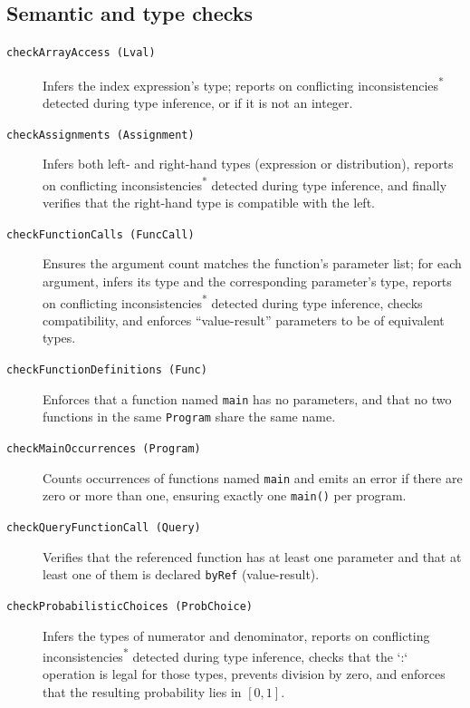 \subsection{Semantic and type checks}

\begin{description}

  \item[\texttt{checkArrayAccess (Lval)}]
    Infers the index expression's type; reports on conflicting inconsistencies\textsuperscript{*} detected during type inference, or if it is not an integer.

  \item[\texttt{checkAssignments (Assignment)}]
    Infers both left- and right-hand types (expression or distribution), reports on conflicting inconsistencies\textsuperscript{*} detected during type inference, and finally verifies that the right-hand type is compatible with the left.

  \item[\texttt{checkFunctionCalls (FuncCall)}]
    Ensures the argument count matches the function's parameter list; for each argument, infers its type and the corresponding parameter's type, reports on conflicting inconsistencies\textsuperscript{*} detected during type inference, checks compatibility, and enforces “value-result” parameters to be of equivalent types.

  \item[\texttt{checkFunctionDefinitions (Func)}]
    Enforces that a function named \texttt{main} has no parameters, and that no two functions in the same \texttt{Program} share the same name.

  \item[\texttt{checkMainOccurrences (Program)}]
    Counts occurrences of functions named \texttt{main} and emits an error if there are zero or more than one, ensuring exactly one \texttt{main()} per program.

  \item[\texttt{checkQueryFunctionCall (Query)}]
    Verifies that the referenced function has at least one parameter and that at least one of them is declared \texttt{byRef} (value-result).

  \item[\texttt{checkProbabilisticChoices (ProbChoice)}]
    Infers the types of numerator and denominator, reports on conflicting inconsistencies\textsuperscript{*} detected during type inference, checks that the `:` operation is legal for those types, prevents division by zero, and enforces that the resulting probability lies in \([0,1]\).


\end{description}
